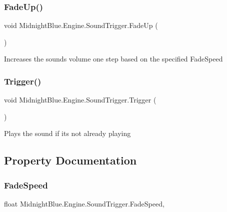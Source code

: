 \subsubsection{\texorpdfstring{Fade\+Up()}{FadeUp()}}
{\footnotesize\ttfamily void Midnight\+Blue.\+Engine.\+Sound\+Trigger.\+Fade\+Up (\begin{DoxyParamCaption}{ }\end{DoxyParamCaption})\hspace{0.3cm}{\ttfamily [inline]}}



Increases the sounds volume one step based on the specified Fade\+Speed 

\hypertarget{class_midnight_blue_1_1_engine_1_1_sound_trigger_a778de9a57b0567bab1d0c97c9084f1d0}{}\label{class_midnight_blue_1_1_engine_1_1_sound_trigger_a778de9a57b0567bab1d0c97c9084f1d0} 
\subsubsection{\texorpdfstring{Trigger()}{Trigger()}}
{\footnotesize\ttfamily void Midnight\+Blue.\+Engine.\+Sound\+Trigger.\+Trigger (\begin{DoxyParamCaption}{ }\end{DoxyParamCaption})\hspace{0.3cm}{\ttfamily [inline]}}



Plays the sound if it\textquotesingle{}s not already playing 



\subsection{Property Documentation}
\hypertarget{class_midnight_blue_1_1_engine_1_1_sound_trigger_a021b23bde55f005a31e4b55080deca65}{}\label{class_midnight_blue_1_1_engine_1_1_sound_trigger_a021b23bde55f005a31e4b55080deca65} 
\subsubsection{\texorpdfstring{Fade\+Speed}{FadeSpeed}}
{\footnotesize\ttfamily float Midnight\+Blue.\+Engine.\+Sound\+Trigger.\+Fade\+Speed\hspace{0.3cm}{\ttfamily [get]}, {\ttfamily [set]}}



